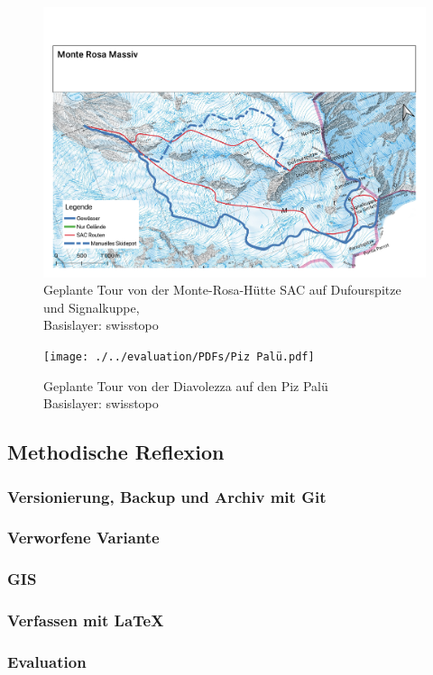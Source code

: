 \begin{Mappage}
{%
    \begin{figure}[H]
      \centering
      \includegraphics[page=1,width=.8\linewidth]{./../evaluation/PDFs/Monte Rosa Massiv.pdf}
      \caption{Geplante Tour von der Monte-Rosa-Hütte SAC auf Dufourspitze und Signalkuppe,\\Basislayer: swisstopo}\label{fig:monterosa}
    \end{figure}
    \par
    \par
    \begin{figure}[H]
      \centering
      \texttt{[image: ./../evaluation/PDFs/Piz Palü.pdf]}
      \caption{Geplante Tour von der Diavolezza auf den Piz Palü\\Basislayer: swisstopo}\label{fig:pizpalu}
    \end{figure}
    \par
    \par


}
\end{Mappage}

\subsection{Methodische Reflexion}
\subsubsection{Versionierung, Backup und Archiv mit Git}
\subsubsection{Verworfene Variante}
\subsubsection{GIS}
\subsubsection{Verfassen mit \LaTeX}
\subsubsection{Evaluation}

